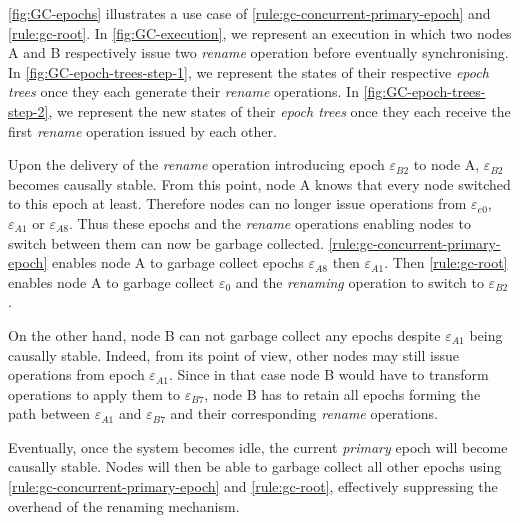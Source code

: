 \documentclass[10pt,journal,compsoc]{IEEEtran}
\newcommand{\epoch}[1]{$\varepsilon_{#1}$}
\begin{document}
\autoref{fig:GC-epochs} illustrates a use case of \autoref{rule:gc-concurrent-primary-epoch} and \autoref{rule:gc-root}.
In \autoref{fig:GC-execution}, we represent an execution in which two nodes A and B respectively issue two \emph{rename} operation before eventually synchronising.
In \autoref{fig:GC-epoch-trees-step-1}, we represent the states of their respective \emph{epoch trees} once they each generate their \emph{rename} operations.
In \autoref{fig:GC-epoch-trees-step-2}, we represent the new states of their \emph{epoch trees} once they each receive the first \emph{rename} operation issued by each other.

Upon the delivery of the \emph{rename} operation introducing epoch \epoch{B2} to node A, \epoch{B2} becomes causally stable.
From this point, node A knows that every node switched to this epoch at least.
Therefore nodes can no longer issue operations from \epoch{e0}, \epoch{A1} or \epoch{A8}.
Thus these epochs and the \emph{rename} operations enabling nodes to switch between them can now be garbage collected.
\autoref{rule:gc-concurrent-primary-epoch} enables node A to garbage collect epochs \epoch{A8} then \epoch{A1}.
Then \autoref{rule:gc-root} enables node A to garbage collect \epoch{0} and the \emph{renaming} operation to switch to \epoch{B2}.

On the other hand, node B can not garbage collect any epochs despite \epoch{A1} being causally stable.
Indeed, from its point of view, other nodes may still issue operations from epoch \epoch{A1}.
Since in that case node B would have to transform operations to apply them to \epoch{B7}, node B has to retain all epochs forming the path between \epoch{A1} and \epoch{B7} and their corresponding \emph{rename} operations.

Eventually, once the system becomes idle, the current \emph{primary} epoch will become causally stable.
Nodes will then be able to garbage collect all other epochs using \autoref{rule:gc-concurrent-primary-epoch} and \autoref{rule:gc-root}, effectively suppressing the overhead of the renaming mechanism.
\end{document}
